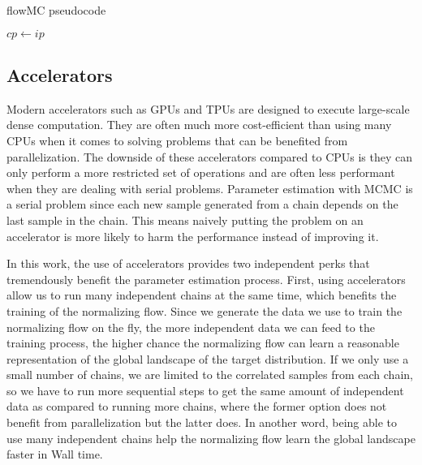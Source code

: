 \documentclass[twocolumn]{aastex631}
\begin{document}
\begin{algorithm}
\caption{flowMC pseudocode}\label{alg:cap}
$cp \leftarrow ip$\\

\end{algorithm}

\subsection{Accelerators}
\label{sec:accelerators}

Modern accelerators such as GPUs and TPUs are designed to execute large-scale
dense computation. They are often much more cost-efficient than using many CPUs
when it comes to solving problems that can be benefited from parallelization.
The downside of these accelerators compared to CPUs is they can only perform a
more restricted set of operations and are often less performant when they are
dealing with serial problems. Parameter estimation with MCMC is a serial
problem since each new sample generated from a chain depends on the last sample
in the chain. This means naively putting the problem on an accelerator is more
likely to harm the performance instead of improving it.


In this work, the use of accelerators provides two independent perks that
tremendously benefit the parameter estimation process. First, using
accelerators allow us to run many independent chains at the same time, which
benefits the training of the normalizing flow. Since we generate the data we use
to train the normalizing flow on the fly, the more independent data we can feed
to the training process, the higher chance the normalizing flow can learn a
reasonable representation of the global landscape of the target distribution. If
we only use a small number of chains, we are limited to the correlated samples
from each chain, so we have to run more sequential steps to get the same amount
of independent data as compared to running more chains, where the former option does
not benefit from parallelization but the latter does. In another word, being
able to use many independent chains help the normalizing flow learn the global
landscape faster in Wall time.
\end{document}

